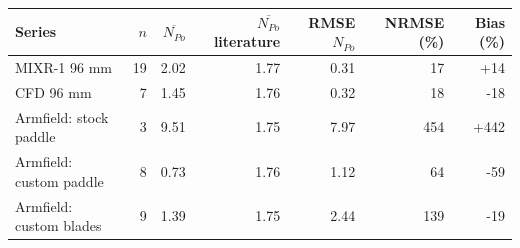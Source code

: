\begin{tabular}{@{}lrrrrrr@{}}
\toprule
Series & $n$ & $\overline{N_{Po}}$ & $\overline{N_{Po}}$ literature & RMSE $N_{Po}$ & NRMSE (\%) & Bias (\%) \\
\midrule
MIXR-1 96 mm & 19 & 2.02 & 1.77 & 0.31 & 17 & +14 \\
CFD 96 mm & 7 & 1.45 & 1.76 & 0.32 & 18 & -18 \\
Armfield: stock paddle & 3 & 9.51 & 1.75 & 7.97 & 454 & +442 \\
Armfield: custom paddle & 8 & 0.73 & 1.76 & 1.12 & 64 & -59 \\
Armfield: custom blades & 9 & 1.39 & 1.75 & 2.44 & 139 & -19 \\
\bottomrule
\end{tabular}
